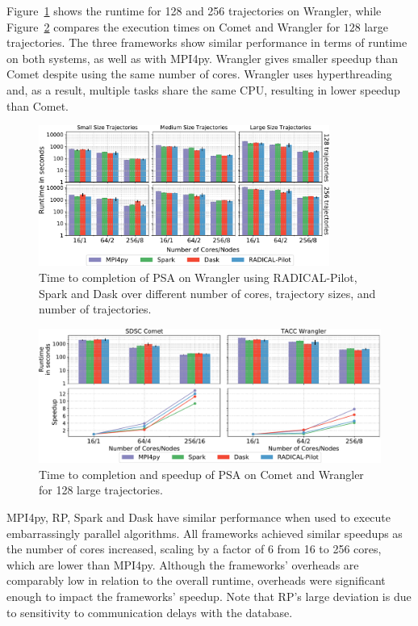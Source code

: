 Figure~\ref{fig:HausdorffWrangler} shows the runtime for 128 and 256
trajectories on Wrangler, while Figure~\ref{fig:comet_wrangler_haus} compares
the execution times on Comet and Wrangler for $128$ large trajectories. The
three frameworks show similar performance in terms of runtime on both systems,
as well as with MPI4py. Wrangler gives smaller speedup than Comet
despite using the same number of cores. Wrangler uses hyperthreading and, as a
result, multiple tasks share the same CPU, resulting in lower speedup than
Comet.

\begin{figure}[t]
    \centering
    \includegraphics[width=0.85\textwidth]{figures/data_analytics_hpc/task_par/HausdorffSingleFig.pdf}
    \caption{Time to completion of PSA on Wrangler using RADICAL-Pilot, Spark
    and Dask over different number of cores, trajectory sizes, and number of
    trajectories.}
    \label{fig:HausdorffWrangler}
\end{figure}

\begin{figure}[t]
    \centering
    \includegraphics[width=.85\textwidth]{figures/data_analytics_hpc/task_par/comet_wrangler_haus.pdf}
    \caption{Time to completion and speedup of PSA on Comet and Wrangler for 128 large trajectories.}
    \label{fig:comet_wrangler_haus}
\end{figure}

MPI4py, RP, Spark and Dask have similar performance when used to
execute embarrassingly parallel algorithms. All frameworks achieved similar
speedups as the number of cores increased, scaling by a factor of 6 from 16 to
256 cores, which are lower than MPI4py. Although the frameworks' overheads are
comparably low in relation to the overall runtime, overheads were significant
enough to impact the frameworks' speedup. Note that RP's large
deviation is due to sensitivity to communication delays with the database.

